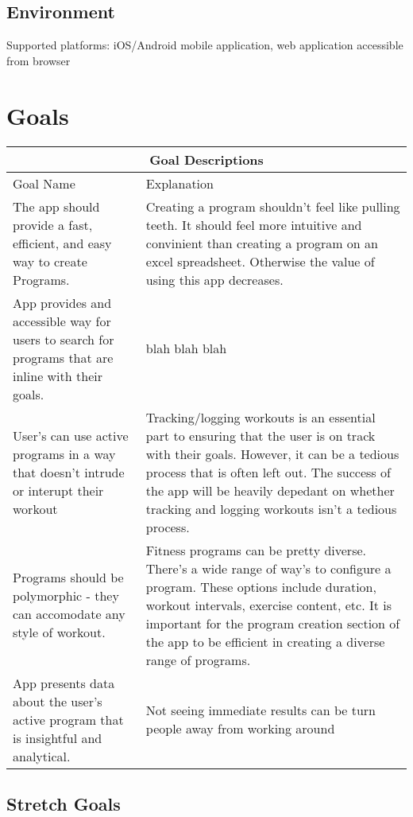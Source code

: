 \documentclass{article}
\begin{document}
\subsection{Environment}
Supported platforms: iOS/Android mobile application, web application accessible from browser


\section{Goals}

\begin{tabular}{ |p{5cm}|p{8cm}| }
	\hline
	\multicolumn{2}{|c|}{Goal Descriptions } \\
	\hline
	Goal Name & Explanation \\
	\hline
	The app should provide a fast, efficient, and easy way to create Programs. & Creating a program shouldn’t feel like pulling teeth. It should feel more intuitive and convinient than creating a program on an excel spreadsheet. Otherwise the value of using this app decreases.  \\
	\hline
	App provides and accessible way for users to search for programs that are inline with their goals. & blah blah blah \\
	\hline
	User’s can use active programs in a way that doesn’t intrude or interupt their workout & Tracking/logging workouts is an essential part to ensuring that the user is on track with their goals. However, it can be a tedious process that is often left out. The success of the app will be heavily depedant on whether tracking and logging workouts isn’t a tedious process. \\
	\hline
	Programs should be polymorphic - they can accomodate any style of workout. & Fitness programs can be pretty diverse. There’s a wide range of way’s to configure a program. These options include duration, workout intervals, exercise content, etc. It is important for the program creation section of the app to be efficient in creating a diverse range of programs. \\
  \hline
	App presents data about the user’s active program that is insightful and analytical. & Not seeing immediate results can be turn people away from working around \\
	\hline
\end{tabular}

\subsection{Stretch Goals}
\end{document}
